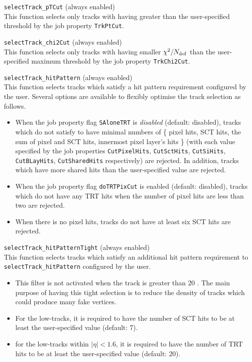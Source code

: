 \begin{description}
\item{{\tt selectTrack\_pTCut} (always enabled)}\\This function selects only tracks with having greater \pt than the user-specified threshold by the job property {\tt TrkPtCut}.
\item{{\tt selectTrack\_chi2Cut} (always enabled)}\\ This function selects only tracks with having smaller $\chi^{2}/N_{\rm dof}$ than the user-specified maximum threshold by the job property {\tt TrkChi2Cut}.
\item{{\tt selectTrack\_hitPattern} (always enabled)}\\ This function selects tracks which satisfy a hit pattern requirement configured by the user. Several options are available to flexibly optimise the track selection as follows.
  \begin{itemize}
  \item When the job property flag {\tt SAloneTRT} is \emph{disabled} (default: disabled), tracks which do not satisfy to have minimal numbers of \{ pixel hits, SCT hits, the sum of pixel and SCT hits, innermost pixel layer's hits \} (with each value specified by the job properties {\tt CutPixelHits}, {\tt CutSctHits}, {\tt CutSiHits}, {\tt CutBLayHits}, {\tt CutSharedHits} respectively) are rejected. In addition, tracks which have more shared hits than the user-specified value are rejected.
  \item When the job property flag {\tt doTRTPixCut} is enabled (default: disabled), tracks which do not have any TRT hits when the number of pixel hits are less than two are rejected.
  \item When there is no pixel hits, tracks do not have at least six SCT hits are rejected.
  \end{itemize}

\item{{\tt selectTrack\_hitPatternTight} (always enabled)}\\ This function selects tracks which satisfy an additional hit pattern requirement to {\tt selectTrack\_hitPattern} configured by the user.
  \begin{itemize}
  \item This filter is not activated when the track \pt is greater than 20 \GeV. The main purpose of having this tight selection is to reduce the density of tracks which could produce many fake vertices.
  \item For the low-\pt tracks, it is required to have the number of SCT hits to be at least the user-specified value (default: 7).
  \item for the low-\pt tracks within $|\eta|<1.6$, it is required to have the number of TRT hits to be at least the user-specified value (default: 20).
  \end{itemize}


\end{description}
